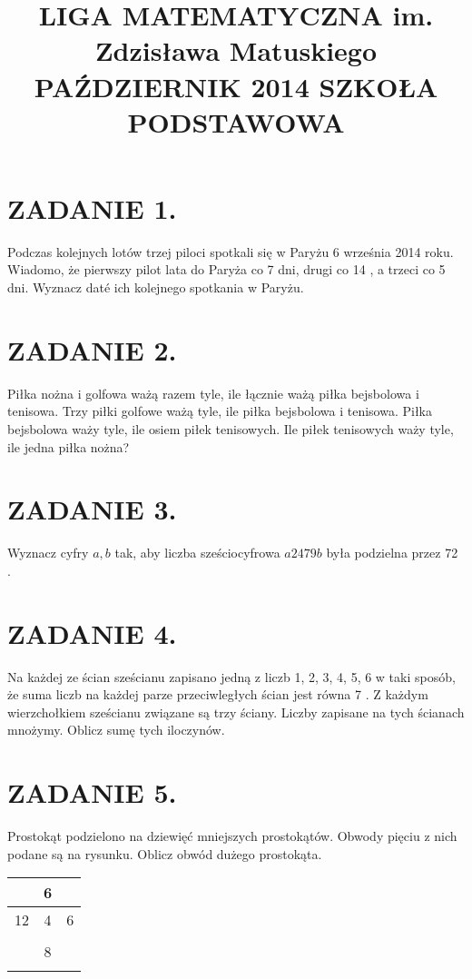 \documentclass[10pt]{article}
\title{LIGA MATEMATYCZNA im. Zdzisława Matuskiego \\
 PAŹDZIERNIK 2014 SZKOŁA PODSTAWOWA }
\author{}
\date{}
\begin{document}
\maketitle
\section*{ZADANIE 1.}
Podczas kolejnych lotów trzej piloci spotkali się w Paryżu 6 września 2014 roku. Wiadomo, że pierwszy pilot lata do Paryża co 7 dni, drugi co 14 , a trzeci co 5 dni. Wyznacz daté ich kolejnego spotkania w Paryżu.

\section*{ZADANIE 2.}
Piłka nożna i golfowa ważą razem tyle, ile łącznie ważą piłka bejsbolowa i tenisowa. Trzy piłki golfowe ważą tyle, ile piłka bejsbolowa i tenisowa. Piłka bejsbolowa waży tyle, ile osiem piłek tenisowych. Ile piłek tenisowych waży tyle, ile jedna piłka nożna?

\section*{ZADANIE 3.}
Wyznacz cyfry \(a, b\) tak, aby liczba sześciocyfrowa \(a 2479 b\) była podzielna przez 72 .

\section*{ZADANIE 4.}
Na każdej ze ścian sześcianu zapisano jedną z liczb 1, 2, 3, 4, 5, 6 w taki sposób, że suma liczb na każdej parze przeciwległych ścian jest równa 7 . Z każdym wierzchołkiem sześcianu związane są trzy ściany. Liczby zapisane na tych ścianach mnożymy. Oblicz sumę tych iloczynów.

\section*{ZADANIE 5.}
Prostokąt podzielono na dziewięć mniejszych prostokątów. Obwody pięciu z nich podane są na rysunku. Oblicz obwód dużego prostokąta.

\begin{center}
\begin{tabular}{|c|c|c|}
\hline
 & 6 &  \\
\hline
12 & 4 & 6 \\
\hline
 &  &  \\
 & 8 &  \\
 &  &  \\
\hline
\end{tabular}
\end{center}
\end{document}
